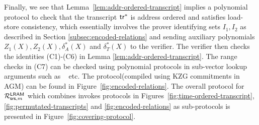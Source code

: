 Finally, we see that Lemma~\ref{lem:addr-ordered-transcript} implies a polynomial protocol to check that the transcript
$\mathsf{tr}^\ast$ is address ordered and satisfies load-store consistency, which
essentially involves the prover identifying sets
$I_1, I_2$ as described in Section \ref{subsec:encoded-relations} and sending auxiliary polynomials $Z_1(X),Z_2(X),\delta^\ast_A(X)$ and $\delta^\ast_T(X)$ to the verifier.
The verifier then checks the identities (C1)-(C6) in Lemma \ref{lem:addr-ordered-transcript}.
The range checks in (C7) can be checked using polynomial protocols in sub-vector lookup arguments such as
~\cite{EPRINT:PosKat22,EPRINT:EagFioGab22,PKC:CFFLL24} etc.
The protocol(compiled using KZG commitments in AGM) can be found in Figure~\ref{fig:encoded-relations}.
The overall protocol for $\mathcal{R}^{\mathsf{LRAM}}_{\mathsf{srs},m}$ which combines invokes protocols in Figures~\ref{fig:time-ordered-transcript},\ref{fig:permutated-transcripts}
and \ref{fig:encoded-relations} as sub-protocols is presented in Figure~\ref{fig:covering-protocol}.

